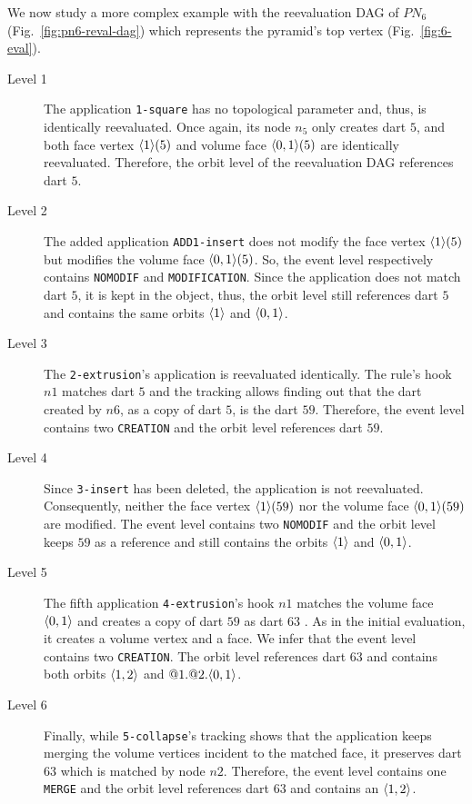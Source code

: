 We now study
a more complex example %
with the reevaluation DAG of $PN_{6}$ (Fig.~\ref{fig:pn6-reval-dag})
which represents the pyramid's top vertex (Fig.~\ref{fig:6-eval}). %
\begin{description}
  \item[Level 1] The application \texttt{1-square} has no topological parameter and, thus, is identically reevaluated. Once again, its node $n_5$ only creates dart $5$, and both face vertex $\langle1\rangle(5)$ and  volume face $\langle0,1\rangle(5)$ are identically reevaluated. Therefore, the orbit level of the reevaluation DAG references dart $5$.
  \item[Level 2] The added application \texttt{ADD1-insert} does not modify the face vertex $\langle1\rangle(5)$ but modifies the volume face $\langle0,1\rangle(5)$.
  So, the event level
  respectively
  contains \texttt{NOMODIF} and \texttt{MODIFICATION}. Since the application does not match dart $5$, it is kept in the object, thus, the orbit level
  still
  references dart $5$ and contains the same orbits $\langle1\rangle$ and $\langle0,1\rangle$.
  \item[Level 3] The \texttt{2-extrusion}'s application is reevaluated identically. The rule's hook $n1$ matches dart $5$ and the tracking allows finding out that the dart created by $n6$, as a copy of dart $5$, is the dart $59$. Therefore, the event level contains two \texttt{CREATION} and the orbit level references dart $59$.
  \item[Level 4] Since \texttt{3-insert} has been deleted, the application is not reevaluated. Consequently, neither the face vertex $\langle1\rangle(59)$ nor the volume face $\langle0,1\rangle(59)$ are modified.
  The event level contains two \texttt{NOMODIF} and the orbit level keeps $59$ as a reference and still contains the orbits $\langle1\rangle$ and $\langle0,1\rangle$.
  \item[Level 5] The fifth application \texttt{4-extrusion}'s hook $n1$ matches the volume face $\langle0,1\rangle$ and creates a copy of dart $59$ %
  as dart $63$ . As in the initial evaluation, it creates a volume vertex and a face. %
  We infer that the event level contains two \texttt{CREATION}. The orbit level references dart $63$ and contains both orbits $\langle1,2\rangle$ and $@1.@2.\langle0,1\rangle$.
  \item[Level 6] Finally, while \texttt{5-collapse}'s tracking shows that the application keeps merging the volume vertices incident to the matched face, it preserves dart $63$ which is matched by node $n2$. Therefore, the event level contains one \texttt{MERGE} and the orbit level references dart $63$ and contains an $\langle1,2\rangle$.
\end{description}

